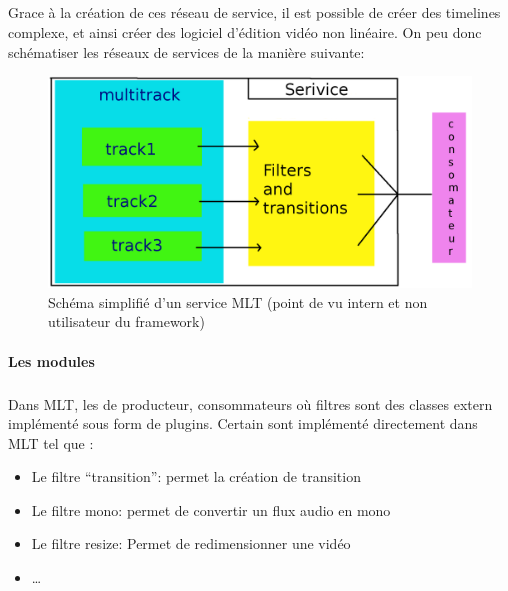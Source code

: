 \subparagraph{}

Grace à la création de ces réseau de service, il est possible de
créer des timelines complexe, et ainsi créer des logiciel d'édition
vidéo non linéaire. On peu donc schématiser les réseaux de services
de la manière suivante:

\begin{figure} [H]

  \begin{center}

    \includegraphics[width=1.0\textwidth]{images/service}

  \end{center}

  \caption{Schéma simplifié d'un service MLT (point de vu intern et
    non utilisateur du framework)}

  \label{Yes}

\end{figure}

\paragraph{Les modules}

\subparagraph{}

Dans MLT, les de producteur, consommateurs où filtres sont des classes
extern implémenté sous form de plugins. Certain sont implémenté
directement dans MLT tel que :

\begin{itemize}

  \item {Le filtre ``transition'': permet la création de transition}

  \item {Le filtre mono: permet de convertir un flux audio en mono}

  \item {Le filtre resize: Permet de redimensionner une vidéo}

  \item {\ldots}

\end{itemize}

